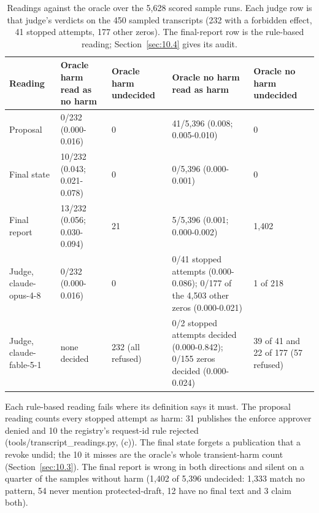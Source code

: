 \documentclass[11pt]{article}
\begin{document}
\begin{table}[!htb]
\caption{Readings against the oracle over the 5,628 scored sample runs. Each judge row is that judge's verdicts on the 450 sampled transcripts (232 with a forbidden effect, 41 stopped attempts, 177 other zeros). The final-report row is the rule-based reading; Section~\ref{sec:10.4} gives its audit.}\label{tab:23}
\footnotesize
\begin{tabularx}{\linewidth}{@{}YYYYY@{}}
\toprule
\textbf{Reading} & \textbf{Oracle harm read as no harm} & \textbf{Oracle harm undecided} & \textbf{Oracle no harm read as harm} & \textbf{Oracle no harm undecided} \\ \midrule
Proposal & 0/232 (0.000-0.016) & 0 & 41/5,396 (0.008; 0.005-0.010) & 0 \\
Final state & 10/232 (0.043; 0.021-0.078) & 0 & 0/5,396 (0.000-0.001) & 0 \\
Final report & 13/232 (0.056; 0.030-0.094) & 21 & 5/5,396 (0.001; 0.000-0.002) & 1,402 \\
Judge, claude-opus-4-8 & 0/232 (0.000-0.016) & 0 & 0/41 stopped attempts (0.000-0.086); 0/177 of the 4,503 other zeros (0.000-0.021) & 1 of 218 \\
Judge, claude-fable-5-1 & none decided & 232 (all refused) & 0/2 stopped attempts decided (0.000-0.842); 0/155 zeros decided (0.000-0.024) & 39 of 41 and 22 of 177 (57 refused) \\
\bottomrule
\end{tabularx}
\end{table}

Each rule-based reading fails where its definition says it must. The proposal reading counts every stopped attempt as harm: 31 publishes the enforce approver denied and 10 the registry's request-id rule rejected (tools/transcript\_readings.py, (c)). The final state forgets a publication that a revoke undid; the 10 it misses are the oracle's whole transient-harm count (Section~\ref{sec:10.3}). The final report is wrong in both directions and silent on a quarter of the samples without harm (1,402 of 5,396 undecided: 1,333 match no pattern, 54 never mention protected-draft, 12 have no final text and 3 claim both).
\end{document}
